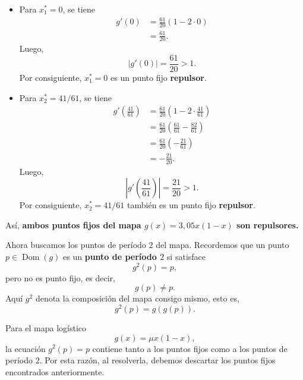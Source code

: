 \documentclass[12pt]{article}
\begin{document}
\begin{itemize}
   

 \item Para $x_1^*=0$, se tiene
\begin{align*}
g'(0)
&=\frac{61}{20}(1-2\cdot 0)\\
&=\frac{61}{20}.
\end{align*}
Luego,
\begin{equation*}
|g'(0)|=\frac{61}{20}>1.
\end{equation*}
Por consiguiente, $x_1^*=0$ es un punto fijo \textbf{repulsor}.

\newpage

 \item Para $x_2^*=41/61$, se tiene
\begin{align*}
g'\left(\frac{41}{61}\right)
&=\frac{61}{20}\left(1-2\cdot\frac{41}{61}\right) \\
&=\frac{61}{20}\left(\frac{61}{61}-\frac{82}{61}\right) \\
&=\frac{61}{20}\left(-\frac{21}{61}\right) \\
&=-\frac{21}{20}.
\end{align*}
Luego,
\begin{equation*}
\left|g'\left(\frac{41}{61}\right)\right|
=
\frac{21}{20}>1.
\end{equation*}
Por consiguiente, $x_2^*=41/61$ también es un punto fijo \textbf{repulsor}.
\end{itemize}
Así, \textbf{ambos puntos fijos del mapa $g(x)=3{,}05x(1-x)$ son repulsores.}

Ahora buscamos los puntos de período $2$ del mapa. Recordemos que un punto $p\in \operatorname{Dom}(g)$ es un \textbf{punto de período $2$} si satisface
\begin{equation}\label{p1.periodo2}
g^2(p)=p,
\end{equation}
pero no es punto fijo, es decir,
\begin{equation*}
g(p)\neq p.
\end{equation*}
Aquí $g^2$ denota la composición del mapa consigo mismo, esto es,
\begin{equation*}
g^2(p)=g(g(p)).
\end{equation*}

Para el mapa logístico
\begin{equation*}
g(x)=\mu x(1-x),
\end{equation*}
la ecuación $g^2(p)=p$ contiene tanto a los puntos fijos como a los puntos de período $2$. Por esta razón, al resolverla, debemos descartar los puntos fijos encontrados anteriormente.
\end{document}
